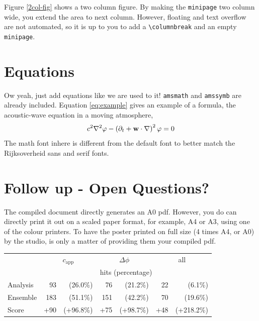 \documentclass{article}
\begin{document}
Figure \ref{2col-fig} shows a two column figure. By making the \verb|minipage| two column wide, you extend the area to next column. However, floating and text overflow are not automated, so it is up to you to add a \verb|\columnbreak| and an empty \verb|minipage|.

\section*{Equations}
Ow yeah, just add equations like we are used to it! \verb|amsmath| and \verb|amssymb| are already included.
Equation \ref{eq:example} gives an example of a formula, the acoustic-wave equation in a moving atmosphere,
\begin{equation}
	c^{2}\nabla^{2} \varphi - \left( \partial_{t} + \bold{w} \cdot \nabla \right)^{2} \varphi = 0
\label{eq:example}
\end{equation}
The math font inhere is different from the default \tex font to better match the Rijksoverheid sans and serif fonts.

\section*{Follow up - Open Questions?}
The compiled \latex document directly generates an A0 pdf. However, you do can directly print it out on a scaled paper format, for example, A4 or A3, using one of the colour printers.
To have the poster printed on full size (4 times A4, or A0) by the studio, is only a matter of providing them your compiled pdf.

\vspace{20pt plus 10pt minus 5pt}
\begin{minipage}[b]{\columnwidth}
%
\begin{center}
\begin{tabular}{l r r | r r | r r}
\hline
& \multicolumn{2}{c}{$c_{\text{app}}$} &  \multicolumn{2}{|c}{$\Delta\phi$} &  \multicolumn{2}{|c}{all} \\
\cline{2-7}
& \multicolumn{6}{c}{hits (percentage)} \\
\hline
Analysis 	& 93	&(26.0\%) & 76 & (21.2\%) &  22 & (6.1\%) \\
Ensemble & 183 &(51.1\%) & 151 & (42.2\%)  & 70 & (19.6\%) \\
Score & +90 & (+96.8\%) & +75 & (+98.7\%)  & +48 & (+218.2\%) \\
\hline
\end{tabular}
\end{center}
\label{table}
%
\end{minipage}
\end{document}
